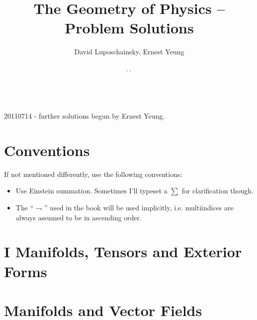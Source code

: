






\title{The Geometry of Physics --\\Problem Solutions}
\author{David Luposchainsky, Ernest Yeung}
\date{\number\day.\,\number\month.\,\number\year}
\maketitle

 \\

20110714 - further solutions begun by Ernest Yeung.


\section*{Conventions}
If not mentioned differently, use the following conventions:
\begin{itemize}
	\item Use Einstein summation. Sometimes I'll typeset a \(\sum\) for clarification though.
	\item The ``\(\rightharpoondown\)'' used in the book will be used implicitly, i.e. multiindices are always assumed to be in ascending order.
\end{itemize}

\newpage

\setcounter{tocdepth}{4}
\tableofcontents

\newpage

\section*{I Manifolds, Tensors and Exterior Forms}
                   
\section{Manifolds and Vector Fields}
 

